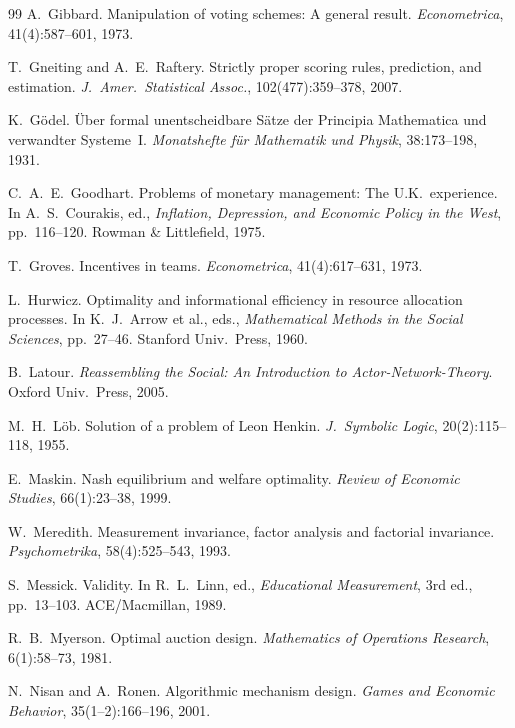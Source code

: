 \documentclass[12pt,a4paper]{article}
\begin{document}
\begin{thebibliography}{99}
A.~Gibbard.
\newblock Manipulation of voting schemes: A general result.
\newblock \emph{Econometrica}, 41(4):587--601, 1973.

T.~Gneiting and A.~E.~Raftery.
\newblock Strictly proper scoring rules, prediction, and estimation.
\newblock \emph{J.\ Amer.\ Statistical Assoc.}, 102(477):359--378, 2007.

K.~G\"{o}del.
\newblock \"{U}ber formal unentscheidbare S\"{a}tze der Principia Mathematica und verwandter Systeme~I.
\newblock \emph{Monatshefte f\"{u}r Mathematik und Physik}, 38:173--198, 1931.

C.~A.~E.~Goodhart.
\newblock Problems of monetary management: The U.K.\ experience.
\newblock In A.~S.~Courakis, ed., \emph{Inflation, Depression, and Economic Policy in the West}, pp.~116--120. Rowman \& Littlefield, 1975.

T.~Groves.
\newblock Incentives in teams.
\newblock \emph{Econometrica}, 41(4):617--631, 1973.

L.~Hurwicz.
\newblock Optimality and informational efficiency in resource allocation processes.
\newblock In K.~J.~Arrow et al., eds., \emph{Mathematical Methods in the Social Sciences}, pp.~27--46. Stanford Univ.\ Press, 1960.

B.~Latour.
\newblock \emph{Reassembling the Social: An Introduction to Actor-Network-Theory}.
\newblock Oxford Univ.\ Press, 2005.

M.~H.~L\"{o}b.
\newblock Solution of a problem of Leon Henkin.
\newblock \emph{J.\ Symbolic Logic}, 20(2):115--118, 1955.

E.~Maskin.
\newblock Nash equilibrium and welfare optimality.
\newblock \emph{Review of Economic Studies}, 66(1):23--38, 1999.

W.~Meredith.
\newblock Measurement invariance, factor analysis and factorial invariance.
\newblock \emph{Psychometrika}, 58(4):525--543, 1993.

S.~Messick.
\newblock Validity.
\newblock In R.~L.~Linn, ed., \emph{Educational Measurement}, 3rd ed., pp.~13--103. ACE/Macmillan, 1989.

R.~B.~Myerson.
\newblock Optimal auction design.
\newblock \emph{Mathematics of Operations Research}, 6(1):58--73, 1981.

N.~Nisan and A.~Ronen.
\newblock Algorithmic mechanism design.
\newblock \emph{Games and Economic Behavior}, 35(1--2):166--196, 2001.


\end{thebibliography}
\end{document}
